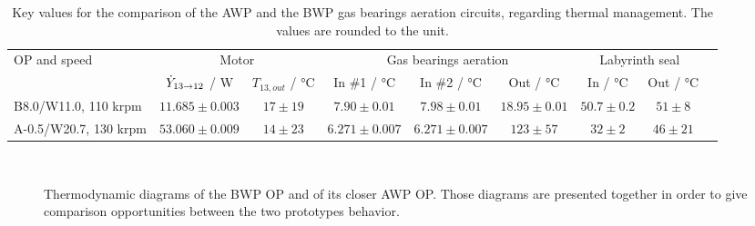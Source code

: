 \begin{table}[htbp]
  \footnotesize
  \centering
\begin{tabular}{lcccccccc}
  \toprule
  \multirow{2}{*}{OP and speed} &
  \multicolumn{2}{c}{Motor} &
  \multicolumn{3}{c}{Gas bearings aeration} &
  \multicolumn{2}{c}{Labyrinth seal}\\
  & $\dot{Y}_{13 \rightarrow 12}$ / \si{\watt} &
  $T_{13,out}$ / \si{\degreeCelsius} & In \#1 / \si{\degreeCelsius} &
  In \#2 / \si{\degreeCelsius} & Out / \si{\degreeCelsius} &
  In / \si{\degreeCelsius} & Out / \si{\degreeCelsius}\\
  \midrule
  B8.0/W11.0, 110 krpm & $\num{11.685} \pm \num{0.003}$ & $\num{17} \pm \num{19}$ & $\pmb{\num{7.90} \pm \num{0.01}}$ & $\pmb{\num{7.98} \pm \num{0.01}}$ & $\pmb{\num{18.95} \pm \num{0.01}}$ & $\num{50.7} \pm \num{0.2}$ & $\num{51} \pm \num{8}$ \\
  A-0.5/W20.7, 130 krpm & $\num{53.060} \pm \num{0.009}$ & $\num{14} \pm \num{23}$ & $\pmb{\num{6.271} \pm \num{0.007}}$ & $\pmb{\num{6.271} \pm \num{0.007}}$ & $\num{123} \pm \num{57}$ & $\num{32} \pm \num{2}$ & $\num{46} \pm \num{21}$ \\
  \bottomrule
\end{tabular}
\caption[Key values for the comparison of the AWP and the BWP gas bearings aeration circuits]{Key values for the comparison of the AWP and the BWP gas bearings aeration circuits, regarding thermal management. The values are rounded to the unit.}
\label{tab:key-values-comp-awp-bwp}
\end{table}

\begin{figure}[htbp]
  \centering
  \hspace{1em}
  \\
  \hspace{1em}
  \caption[Thermodynamic diagrams of the BWP OP and of its closer AWP
  OP]{Thermodynamic diagrams of the BWP OP and of its closer AWP
    OP. Those diagrams are presented together in order to give
    comparison opportunities between the two prototypes behavior.}
  \label{fig:bwp-B8.0/W11.0-A-0.5/W20.7-diagrams}
\end{figure}

